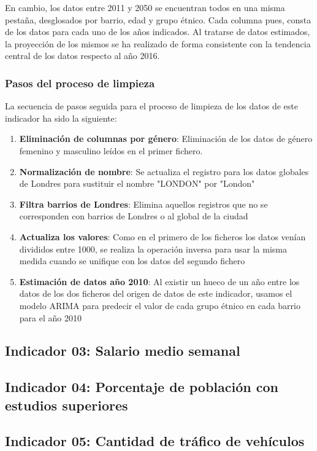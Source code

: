 \documentclass[12pt,a4paper,twoside]{book}
\begin{document}
En cambio, los datos entre 2011 y 2050 se encuentran todos en una misma pestaña, desglosados por barrio, edad y grupo étnico. Cada columna pues, consta de los datos para cada uno de los años indicados. Al tratarse de datos estimados, la proyección de los mismos se ha realizado de forma consistente con la tendencia central de los datos respecto al año 2016.

\subsubsection{Pasos del proceso de limpieza}

La secuencia de pasos seguida para el proceso de limpieza de los datos de este indicador ha sido la siguiente:

\begin{enumerate}
    \item \textbf{Eliminación de columnas por género}: Eliminación de los datos de género femenino y masculino leídos en el primer fichero.
    \item \textbf{Normalización de nombre}: Se actualiza el registro para los datos globales de Londres para sustituir el nombre "LONDON" por "London"
    \item \textbf{Filtra barrios de Londres}: Elimina aquellos registros que no se corresponden con barrios de Londres o al global de la ciudad
    \item \textbf{Actualiza los valores}: Como en el primero de los ficheros los datos venían divididos entre 1000, se realiza la operación inversa para usar la misma medida cuando se unifique con los datos del segundo fichero
    \item \textbf{Estimación de datos año 2010}: Al existir un hueco de un año entre los datos de los dos ficheros del origen de datos de este indicador, usamos el modelo ARIMA para predecir el valor de cada grupo étnico en cada barrio para el año 2010
\end{enumerate}

\subsection{Indicador 03: Salario medio semanal}

\subsection{Indicador 04: Porcentaje de población con estudios superiores}

\subsection{Indicador 05: Cantidad de tráfico de vehículos}
\end{document}
